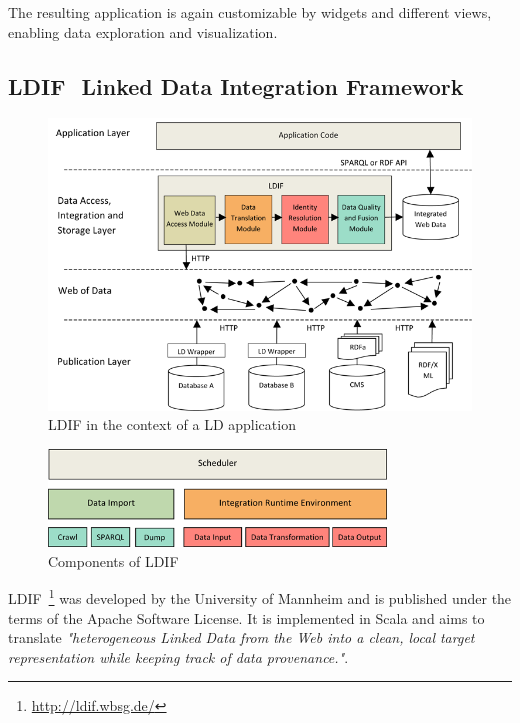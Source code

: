 The resulting application is again customizable by widgets and different views, enabling data exploration and visualization.

\subsection{LDIF  Linked Data Integration Framework}

\begin{figure}[htbp]
	\centering
\includegraphics[width=\textwidth]{img/ldif_context.png}
	\caption{LDIF in the context of a LD application}
	\label{ldif_context}
\end{figure}

\begin{figure}[htbp]
	\centering
\includegraphics[width=0.8\textwidth]{img/ldif_components.png}
	\caption{Components of LDIF}
	\label{ldif_components}
\end{figure}


LDIF~\footnote{\url{http://ldif.wbsg.de/}} was developed by the University of Mannheim and is published under the terms of the Apache Software License. It is implemented in Scala and aims to translate \emph{"heterogeneous Linked Data from the Web into a clean, local target representation while keeping track of data provenance."}.

